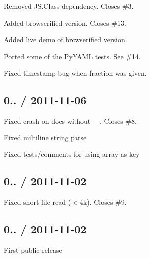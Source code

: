 \begin{DoxyItemize}
\item Removed J\+S.\+Class dependency. Closes \#3.
\item Added browserified version. Closes \#13.
\item Added live demo of browserified version.
\item Ported some of the Py\+Y\+A\+ML tests. See \#14.
\item Fixed timestamp bug when fraction was given.
\end{DoxyItemize}

\subsection*{0.. / 2011-\/11-\/06 }


\begin{DoxyItemize}
\item Fixed crash on docs without ---. Closes \#8.
\item Fixed miltiline string parse
\item Fixed tests/comments for using array as key
\end{DoxyItemize}

\subsection*{0.. / 2011-\/11-\/02 }


\begin{DoxyItemize}
\item Fixed short file read ($<$4k). Closes \#9.
\end{DoxyItemize}

\subsection*{0.. / 2011-\/11-\/02 }


\begin{DoxyItemize}
\item First public release 
\end{DoxyItemize}